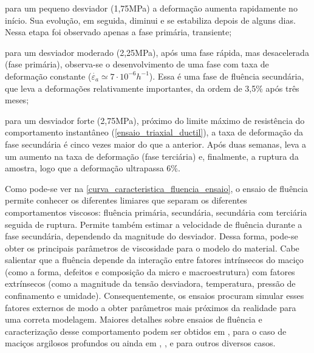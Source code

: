 \begin{alineas}
	
	\item para um pequeno desviador (1,75MPa) a deformação aumenta rapidamente no início. Sua evolução, em seguida, diminui e se estabiliza depois de alguns dias. Nessa etapa foi observado apenas a fase primária, transiente;
	
	\item para um desviador moderado (2,25MPa), após uma fase rápida, mas desacelerada (fase primária), observa-se o desenvolvimento de uma fase com taxa de deformação constante ($\dot{\varepsilon_a}\simeq 7\cdot {{10}^{-6}}{{h}^{-1}}$). Essa é uma fase de fluência secundária, que leva a deformações relativamente importantes, da ordem de 3,5\% após três meses;
	
	\item para um desviador forte (2,75MPa), próximo do limite máximo de resistência do comportamento instantâneo (\autoref{ensaio_triaxial_ductil}), a taxa de deformação da fase secundária é cinco vezes maior do que a anterior. Após duas semanas, leva a um aumento na taxa de deformação (fase terciária) e, finalmente, a ruptura da amostra, logo que a deformação ultrapassa 6\%.
	
\end{alineas}

Como pode-se ver na \autoref{curva_caracteristica_fluencia_ensaio}, o ensaio de fluência permite conhecer os diferentes limiares que separam os diferentes comportamentos viscosos: fluência primária, secundária, secundária com terciária seguida de ruptura. Permite também estimar a velocidade de fluência durante a fase secundária, dependendo da magnitude do desviador. Dessa forma, pode-se obter os principais parâmetros de viscosidade para o modelo do material. Cabe salientar que a fluência depende da interação entre fatores intrínsecos do maciço (como a forma, defeitos e composição da micro e macroestrutura) com fatores extrínsecos (como a magnitude da tensão desviadora, temperatura, pressão de confinamento e umidade). Consequentemente, os ensaios procuram simular esses fatores externos de modo a obter parâmetros mais próximos da realidade para uma correta modelagem. Maiores detalhes sobre ensaios de fluência e caracterização desse comportamento podem ser obtidos em , para o caso de maciços argilosos profundos ou ainda em , ,  e  para outros diversos casos.

